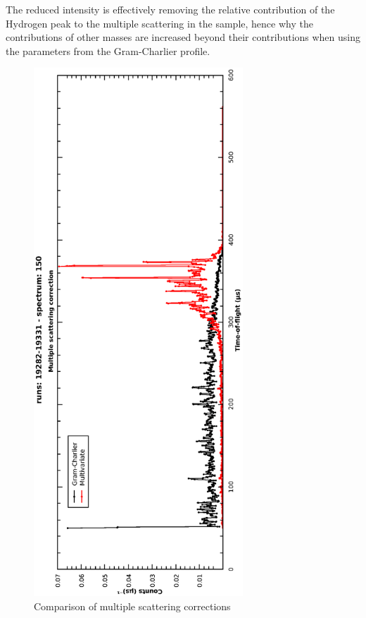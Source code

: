 \documentclass[a4paper]{article}
\begin{document}
The reduced intensity is effectively removing the relative contribution of the
Hydrogen peak to the multiple scattering in the sample, hence why the
contributions of other masses are increased beyond their contributions when
using the parameters from the Gram-Charlier profile.

\begin{figure}[h!]
  \centering
  \begin{turn}{-90}
    \includegraphics[width=0.7\textwidth]{graphics/mvg_multiple_scattering_corr.eps}
  \end{turn}
  \vspace{-80pt}
  \caption{Comparison of multiple scattering corrections}
  \label{fig:mvg_multiple_scattering_corr}
\end{figure}
\FloatBarrier
\end{document}
